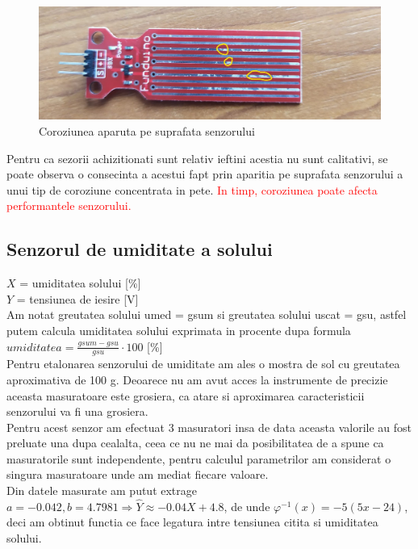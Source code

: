 \documentclass[12pt]{article}
\begin{document}
\begin{figure}[H]
\centering
\includegraphics[width=\textwidth]{Pictures/coroziune.jpg}
\caption{Coroziunea aparuta pe suprafata senzorului}
\end{figure}

Pentru ca sezorii achizitionati sunt relativ ieftini acestia nu sunt calitativi, se poate observa o consecinta a acestui fapt prin aparitia pe suprafata senzorului a unui tip de coroziune concentrata in pete. \textcolor{red}{In timp, coroziunea poate afecta performantele senzorului.}

\newpage

\subsection{Senzorul de umiditate a solului}

$X$ = umiditatea solului [\%] \\
$Y$ = tensiunea de iesire [V] \\
Am notat greutatea solului umed = gsum si greutatea solului uscat = gsu, astfel putem calcula umiditatea solului exprimata in procente dupa formula $umiditatea = \frac{gsum - gsu}{gsu} \cdot 100$ [\%]\\
Pentru etalonarea senzorului de umiditate am ales o mostra de sol cu greutatea aproximativa de 100 g. Deoarece nu am avut acces la instrumente de precizie aceasta masuratoare este grosiera, ca atare si aproximarea caracteristicii senzorului va fi una grosiera. \\
Pentru acest senzor am efectuat 3 masuratori insa de data aceasta valorile au fost preluate una dupa cealalta, ceea ce nu ne mai da posibilitatea de a spune ca masuratorile sunt independente, pentru calculul parametrilor am considerat o singura masuratoare unde am mediat fiecare valoare. \\
Din datele masurate am putut extrage $a = -0.042, b = 4.7981 \Rightarrow \hat{Y} \approx -0.04X + 4.8$, de unde $\varphi^{-1}(x) = -5(5x-24)$, deci am obtinut functia ce face legatura intre tensiunea citita si umiditatea solului.
\end{document}

